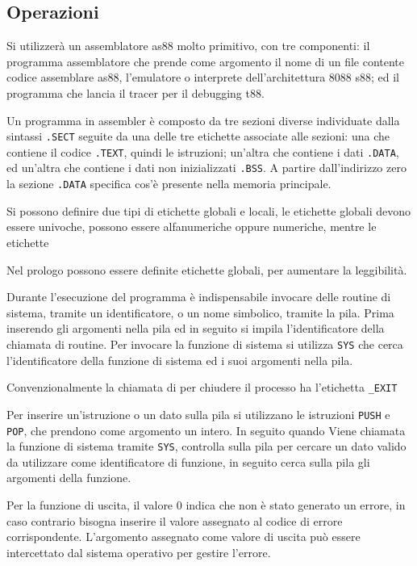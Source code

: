 \documentclass{article}
\numberwithin{equation}{subsection}
\begin{document}

\subsection{Operazioni}

Si utilizzerà un assemblatore as88 molto primitivo, con tre componenti: il programma assemblatore che prende come argomento il nome di un file contente codice assemblare as88, 
l'emulatore o interprete dell'architettura 8088 s88; ed il programma che lancia il tracer per il debugging t88. 


Un programma in assembler è composto da tre sezioni diverse individuate dalla sintassi \verb|.SECT| seguite da una delle tre etichette associate alle sezioni: una che contiene 
il codice \verb|.TEXT|, quindi le istruzioni; un'altra che contiene i dati \verb|.DATA|, ed un'altra che contiene i dati non inizializzati \verb|.BSS|. 
A partire dall'indirizzo zero la sezione \verb|.DATA| specifica cos'è presente nella memoria principale. 

Si possono definire due tipi di etichette globali e locali, le etichette globali devono essere univoche, possono essere alfanumeriche oppure numeriche, mentre le 
etichette 

Nel prologo possono essere definite etichette globali, per aumentare la leggibilità. 


Durante l'esecuzione del programma è indispensabile invocare delle routine di sistema, tramite un identificatore, o un nome simbolico, tramite la pila. Prima inserendo gli 
argomenti nella pila ed in seguito si impila l'identificatore della chiamata di routine. Per invocare la funzione di sistema si utilizza \verb|SYS| che cerca l'identificatore 
della funzione di sistema ed i suoi argomenti nella pila. 

Convenzionalmente la chiamata di per chiudere il processo ha l'etichetta \verb|_EXIT|

Per inserire un'istruzione o un dato sulla pila si utilizzano le istruzioni \verb|PUSH| e \verb|POP|, che prendono come argomento un intero. In seguito quando 
Viene chiamata la funzione di sistema tramite \verb|SYS|, controlla sulla pila per cercare un dato valido da utilizzare come 
identificatore di funzione, in seguito cerca sulla pila gli argomenti della funzione. 

Per la funzione di uscita, il valore 0 indica che non è stato generato un errore, in caso contrario 
bisogna inserire il valore assegnato al codice di errore corrispondente. L'argomento assegnato come 
valore di uscita può essere intercettato dal sistema operativo per gestire l'errore. 
\end{document}
